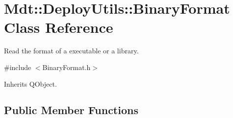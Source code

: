 \hypertarget{class_mdt_1_1_deploy_utils_1_1_binary_format}{}\section{Mdt\+:\+:Deploy\+Utils\+:\+:Binary\+Format Class Reference}
\label{class_mdt_1_1_deploy_utils_1_1_binary_format}


Read the format of a executable or a library.  




{\ttfamily \#include $<$Binary\+Format.\+h$>$}



Inherits Q\+Object.

\subsection*{Public Member Functions}
